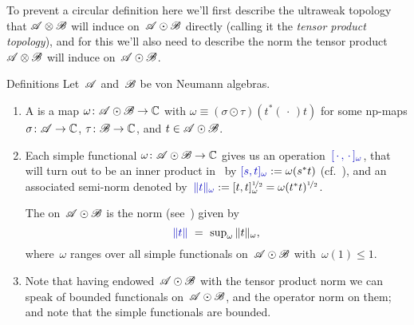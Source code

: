 \documentclass[a]{subfiles}
\begin{document}
\begin{parsec}
\begin{point}
To prevent a circular definition
here
we'll first describe the ultraweak topology
that $\mathscr{A}\otimes \mathscr{B}$ will induce on~$\mathscr{A}\odot \mathscr{B}$
directly
(calling it the \emph{tensor product topology}),
and for this
we'll also need to describe the norm
the tensor product~$\mathscr{A}\otimes\mathscr{B}$
will induce on~$\mathscr{A}\odot\mathscr{B}$.
\end{point}
\begin{point}{Definitions}%
Let~$\mathscr{A}$ and~$\mathscr{B}$ be von Neumann algebras.
\begin{enumerate}
\item
A 
is 
a map $\omega \colon \mathscr{A}\odot\mathscr{B}\to\mathbb{C}$
with
$\omega\equiv (\sigma\odot \tau)(t^*(\,\cdot\,)t)$
for some np-maps
$\sigma\colon \mathscr{A}\to\mathbb{C}$, $\tau\colon \mathscr{B}\to\mathbb{C}$,
and
$t\in \mathscr{A}\odot\mathscr{B}$.
\item
Each simple functional $\omega \colon \mathscr{A}\odot\mathscr{B}\to\mathbb{C}$
gives us an operation~$\Define{[\,\cdot\,,\,\cdot\,]_\omega}$,
that will turn out to be an inner product in~
 by
$\Define{[s,t]_\omega}:=\omega(s^*t)$
(cf.~),
and an associated semi-norm
denoted by~$\Define{\|t\|_\omega}:=[t,t]_\omega^{\smash{\nicefrac{1}{2}}} 
= \omega(t^*t)^{\nicefrac{1}{2}}$.

The 
on~$\mathscr{A}\odot \mathscr{B}$
is the norm (see~)
given by
\begin{equation*}
	\textstyle
	\Define{\|t\|}\ =\ \sup_\omega \|t\|_\omega,
\end{equation*}
where~$\omega$ ranges over all simple functionals
on~$\mathscr{A}\odot\mathscr{B}$
with~$\omega(1)\leq 1$.
\item
Note that having endowed~$\mathscr{A}\odot \mathscr{B}$
with the tensor product norm
we can speak of bounded functionals on~$\mathscr{A}\odot \mathscr{B}$,
and the operator norm on them;
and note that
the simple functionals are bounded.


\end{enumerate}
\end{point}
\end{parsec}
\end{document}

